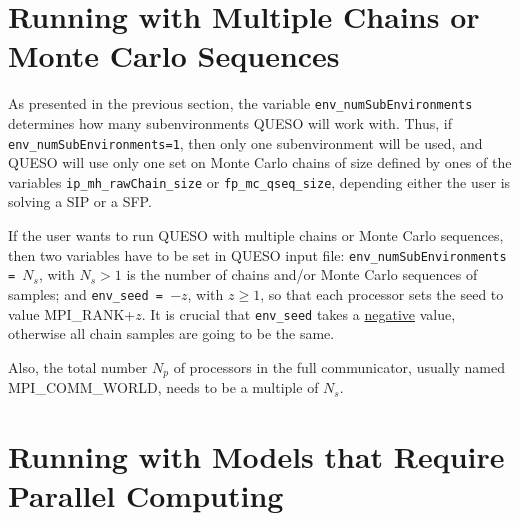 \section{Running with Multiple Chains or Monte Carlo Sequences}

\new{}\vspace{-30pt}
\begin{leftbar}
 
As presented in the previous section, the variable \verb+env_numSubEnvironments+ determines how many subenvironments QUESO will work with. Thus, if \verb+env_numSubEnvironments=1+, then   only one subenvironment will be used, and QUESO will use only one set on Monte Carlo chains of size defined by ones of the variables \verb+ip_mh_rawChain_size+ or \verb+fp_mc_qseq_size+, depending either the user is solving a SIP or a SFP.

If the user wants to run QUESO with multiple chains or Monte Carlo sequences, then two variables have to be set in QUESO input file: \verb+env_numSubEnvironments = +$N_s$, with $N_s>1$ is the number of chains and/or Monte Carlo sequences of samples; and \verb+env_seed = +$-z$, with $z\geqslant 1$, so that each processor sets the seed to value MPI\_RANK+$z$.
It is crucial that \verb+env_seed+ takes a \underline{negative} value, otherwise all chain samples are going to be the same.

Also, the total number $N_p$ of processors in the full communicator, usually named \linebreak MPI\_COMM\_WORLD, needs to be a multiple of $N_s$.
\end{leftbar}



\section{Running with Models that Require Parallel Computing}



